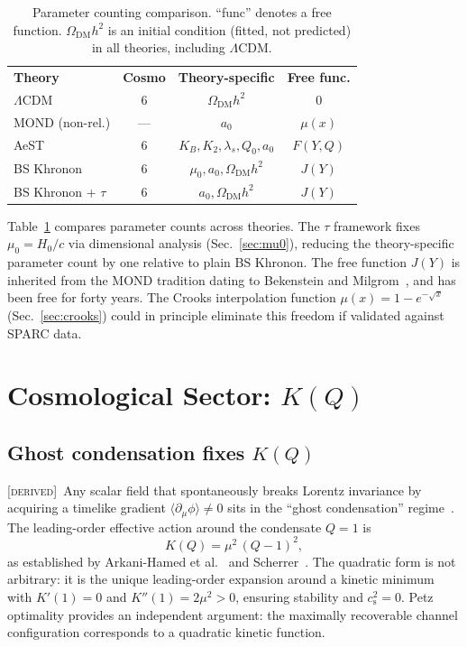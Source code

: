 \documentclass[prd,twocolumn,superscriptaddress,longbibliography,floatfix]{revtex4-2}
\newcommand{\tauasym}{\tau}
\newcommand{\cs}{c_{\mathrm{s}}}
\newcommand{\derived}{\textsc{[derived]}}
\begin{document}
\begin{table}[b]
\caption{\label{tab:params}Parameter counting comparison.
``func'' denotes a free function.
$\Omega_{\mathrm{DM}}h^2$ is an initial condition (fitted, not
predicted) in all theories, including $\Lambda$CDM.}
\begin{ruledtabular}
\begin{tabular}{lccc}
\textbf{Theory} & \textbf{Cosmo} & \textbf{Theory-specific}
  & \textbf{Free func.} \\
\colrule
$\Lambda$CDM & 6 & $\Omega_{\mathrm{DM}}h^2$ & 0 \\
MOND (non-rel.) & --- & $a_0$ & $\mu(x)$ \\
AeST~\cite{SZ2021prl} & 6 & $K_B, K_2, \lambda_s, Q_0, a_0$ & $F(Y,Q)$ \\
BS Khronon & 6 & $\mu_0, a_0, \Omega_{\mathrm{DM}}h^2$ & $J(Y)$ \\
BS Khronon + $\tauasym$ & 6 & $a_0, \Omega_{\mathrm{DM}}h^2$ & $J(Y)$ \\
\end{tabular}
\end{ruledtabular}
\end{table}

Table~\ref{tab:params} compares parameter counts across theories.
The $\tauasym$ framework fixes $\mu_0 = H_0/c$ via dimensional
analysis (Sec.~\ref{sec:mu0}), reducing the theory-specific
parameter count by one relative to plain BS Khronon.  The free
function $J(Y)$ is inherited from the MOND tradition dating to
Bekenstein and Milgrom~\cite{BekensteinMilgrom1984}, and has been
free for forty years.  The Crooks interpolation function
$\mu(x) = 1 - e^{-\sqrt{x}}$ (Sec.~\ref{sec:crooks}) could in
principle eliminate this freedom if validated against SPARC data.


\section{Cosmological Sector: $K(Q)$}
\label{sec:cosmo}

\subsection{Ghost condensation fixes $K(Q)$}
\label{sec:KQ}

\derived\  Any scalar field that spontaneously breaks Lorentz
invariance by acquiring a timelike gradient
$\langle\partial_\mu\phi\rangle \neq 0$ sits in the ``ghost
condensation'' regime~\cite{AHCLM2004}.  The leading-order
effective action around the condensate $Q = 1$ is
\begin{equation}
K(Q) = \mu^2\,(Q - 1)^2,
\label{eq:KQ}
\end{equation}
as established by Arkani-Hamed et al.~\cite{AHCLM2004} and
Scherrer~\cite{Scherrer2004}.  The quadratic form is not
arbitrary: it is the unique leading-order expansion around
a kinetic minimum with $K'(1) = 0$ and $K''(1) = 2\mu^2 > 0$,
ensuring stability and $\cs^2 = 0$.  Petz optimality provides
an independent argument: the maximally recoverable channel
configuration corresponds to a quadratic kinetic function.
\end{document}
